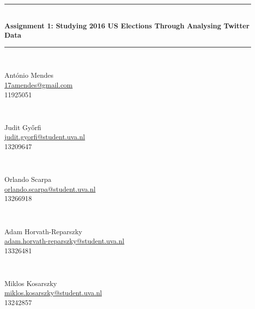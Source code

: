 \documentclass{article}
\newcommand\email[1]{
    \href{mailto:#1}{\url{#1}}
}
\begin{document}
\begin{titlepage}
  \newcommand{\HRule}{\rule{\linewidth{0.5mm}}}

    \begin{center}
      \rule{\linewidth}{0.5mm} \\
      \vspace{0.5 cm}
      \huge{\bfseries Assignment 1: Studying 2016 US Elections Through
        Analysing Twitter Data}
      \rule{\linewidth}{0.5mm}
      \\[1.2 cm]
      \begin{minipage}{0.45\textwidth}
        \begin{flushleft}
        \large
        António Mendes\\
        {\small\email{17amendes@gmail.com}} \\
        {\small 11925051}
        \end{flushleft}
      \end{minipage}
      ~
      \begin{minipage}{0.4\textwidth}
        \begin{flushright}
          \large
          Judit Győrfi\\
          {\small \email{judit.gyorfi@student.uva.nl}}\\
          {\small 13209647}
        \end{flushright}
      \end{minipage}
      \\[1cm]
      \begin{minipage}{0.45\textwidth}
        \begin{flushleft}
        \large
        Orlando Scarpa\\
        {\small \email{orlando.scarpa@student.uva.nl}}\\
        {\small 13266918}
        \end{flushleft}
      \end{minipage}
      ~
      \begin{minipage}{0.4\textwidth}
        \begin{flushright}
          \large
          Adam Horvath-Reparszky\\
          {\small \email{adam.horvath-reparszky@student.uva.nl}}\\
          {\small 13326481}
        \end{flushright}
      \end{minipage}
      \\[1cm]
      \begin{minipage}{0.5\textwidth}
        \begin{center}
          \large
          Miklos Kosarszky\\
          {\small\email{miklos.kosarszky@student.uva.nl}}\\
          {\small 13242857}
        \end{center}
      \end{minipage}
      \vfill
      \vfill
      \vfill
    \end{center}
  \end{titlepage}
\end{document}
